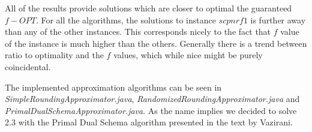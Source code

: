 All of the results provide solutions which are closer to optimal the guaranteed $f-OPT$. For all the algorithms, the solutions to instance $scpnrf1$ is further away than any of the other instances. This corresponds nicely to the fact that $f$ value of the instance is much higher than the others. Generally there is a trend between ratio to optimality and the $f$ values, which while nice might be purely coincidental.

\noindent
The implemented approximation algorithms can be seen in \textit{SimpleRoundingApproximator.java}, \textit{RandomizedRoundingApproximator.java} and \textit{PrimalDualSchemaApproximator.java}. As the name implies we decided to solve 2.3 with the Primal Dual Schema algorithm presented in the text by Vazirani.

